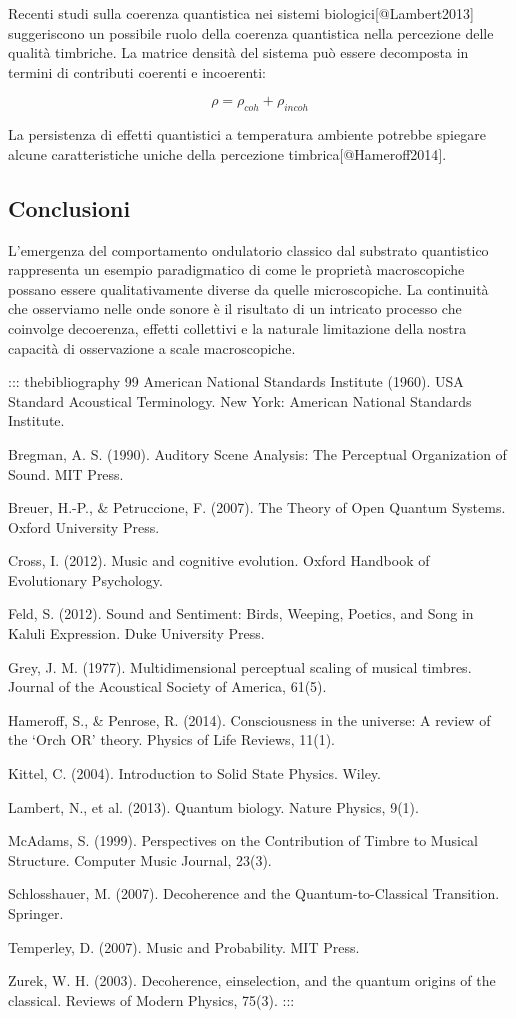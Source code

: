 \documentclass[a4paper,11pt]{article}
\begin{document}
Recenti studi sulla coerenza quantistica nei sistemi
biologici{[}@Lambert2013{]} suggeriscono un possibile ruolo della coerenza
quantistica nella percezione delle qualità timbriche. La matrice densità
del sistema può essere decomposta in termini di contributi coerenti e
incoerenti:

\begin{displaymath}
\rho = \rho_{coh} + \rho_{incoh}
\end{displaymath}

La persistenza di effetti quantistici a temperatura ambiente potrebbe
spiegare alcune caratteristiche uniche della percezione
timbrica{[}@Hameroff2014{]}.

\subsection{Conclusioni}\hypertarget{conclusioni}{}\label{conclusioni}

L'emergenza del comportamento ondulatorio classico dal substrato
quantistico rappresenta un esempio paradigmatico di come le proprietà
macroscopiche possano essere qualitativamente diverse da quelle
microscopiche. La continuità che osserviamo nelle onde sonore è il
risultato di un intricato processo che coinvolge decoerenza, effetti
collettivi e la naturale limitazione della nostra capacità di
osservazione a scale macroscopiche.

::: thebibliography
99 American National Standards Institute (1960). USA Standard Acoustical
Terminology. New York: American National Standards Institute.

Bregman, A. S. (1990). Auditory Scene Analysis: The Perceptual
Organization of Sound. MIT Press.

Breuer, H.-P., \& Petruccione, F. (2007). The Theory of Open Quantum
Systems. Oxford University Press.

Cross, I. (2012). Music and cognitive evolution. Oxford Handbook of
Evolutionary Psychology.

Feld, S. (2012). Sound and Sentiment: Birds, Weeping, Poetics, and Song
in Kaluli Expression. Duke University Press.

Grey, J. M. (1977). Multidimensional perceptual scaling of musical
timbres. Journal of the Acoustical Society of America, 61(5).

Hameroff, S., \& Penrose, R. (2014). Consciousness in the universe: A
review of the `Orch OR' theory. Physics of Life Reviews, 11(1).

Kittel, C. (2004). Introduction to Solid State Physics. Wiley.

Lambert, N., et al. (2013). Quantum biology. Nature Physics, 9(1).

McAdams, S. (1999). Perspectives on the Contribution of Timbre to
Musical Structure. Computer Music Journal, 23(3).

Schlosshauer, M. (2007). Decoherence and the Quantum-to-Classical
Transition. Springer.

Temperley, D. (2007). Music and Probability. MIT Press.

Zurek, W. H. (2003). Decoherence, einselection, and the quantum origins
of the classical. Reviews of Modern Physics, 75(3).
:::
\end{document}
